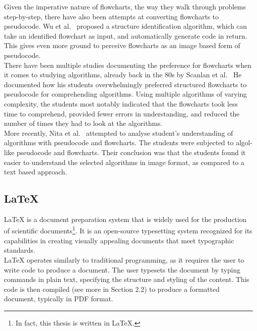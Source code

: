 Given the imperative nature of flowcharts, the way they walk through problems step-by-step, there have also been attempts at converting flowcharts to pseudocode. Wu et al.~\cite{codeFromFlowcharts} proposed a structure identification algorithm, which can take an identified flowchart as input, and automatically generate code in return. This gives even more ground to perceive flowcharts as an image based form of pseudocode. \hfill \\

There have been multiple studies documenting the preference for flowcharts when it comes to studying algorithms, already back in the 80s by Scanlan et al.~\cite{DBLP:journals/software/Scanlan89} He documented how his students overwhelmingly preferred structured flowcharts to pseudocode for comprehending algorithms. Using multiple algorithms of varying complexity, the students most notably indicated that the flowcharts took less time to comprehend, provided fewer errors in understanding, and reduced the number of times they had to look at the algorithms. \hfill \\

More recently, Nita et al.~\cite{Nita_2020} attempted to analyse student's understanding of algorithms with pseudocode and flowcharts. The students were subjected to algol-like pseudocode and flowcharts. Their conclusion was that the students found it easier to understand the selected algorithms in image format, as compared to a text based approach.


\subsection{LaTeX}

LaTeX is a document preparation system that is widely used for the production of scientific documents\footnote{In fact, this thesis is written in LaTeX.}. It is an open-source typesetting system recognized for its capabilities in creating visually appealing documents that meet typographic standards. \hfill \\

LaTeX operates similarly to traditional programming, as it requires the user to write code to produce a document. The user typesets the document by typing commands in plain text, specifying the structure and styling of the content. This code is then compiled (see more in Section 2.2) to produce a formatted document, typically in PDF format. \hfill \\

